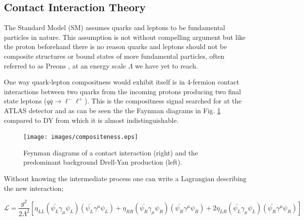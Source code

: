     \subsection{Contact Interaction Theory}
        \label{sec:CItheory}

        The Standard Model (SM) assumes quarks and leptons to be fundamental particles in nature. This assumption is not without compelling argument but like the proton beforehand there is no reason quarks and leptons should not be composite structures or bound states of more fundamental particles, often referred to as Preons \cite{Eichten:1983hw}, at an energy scale $\Lambda$ we have yet to reach. 

        One way quark-lepton compositness would exhibit itself is in 4-fermion contact interactions between two quarks from the incoming protons producing two final state leptons ($q\bar{q} \rightarrow \ell^{-}\ell^{+}$). This is the compositness signal searched for at the ATLAS detector and as can be seen the the Faynman diagrams in Fig. \ref{fig:fd} compared to DY from which it is almost indistinguishable.

        \begin{figure}[h]
            \begin{center}
            \texttt{[image: images/compositeness.eps]}
            \end{center}
            \caption{Feynman diagrams of a contact interaction (right) and the predominant background Drell-Yan production (left).}
            \label{fig:fd}
        \end{figure}

        Without knowing the intermediate process one can write a Lagrangian describing the new interaction; 

        \begin{equation}
            \mathcal{L} = \frac{g^{2}}{2\Lambda^{2}}
                [\eta_{LL} (\bar{\psi_{L}}\gamma_{\mu}\psi_{L}) (\bar{\psi_{L}}\gamma^{\mu}\psi_{L}) 
                + \eta_{RR} (\bar{\psi_{R}}\gamma_{\mu}\psi_{R}) (\bar{\psi_{R}}\gamma^{\mu}\psi_{R}) 
                + 2\eta_{LR} (\bar{\psi_{L}}\gamma_{\mu}\psi_{L}) (\bar{\psi_{R}}\gamma^{\mu}\psi_{R}) ]
        \end{equation}

